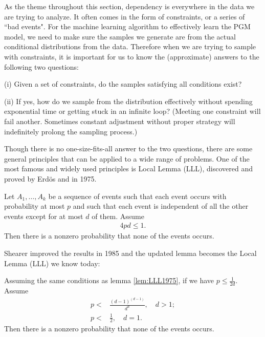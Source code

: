 As the theme throughout this section, dependency is everywhere in the data we
are trying to analyze. It often comes in the form of constraints, or a series
of ``bad events". For the machine learning algorithm to effectively learn the
PGM model, we need to make sure the samples we generate are from the actual
conditional distributions from the data. Therefore when we are trying to
sample with constraints, it is important for us to know the (approximate)
answers to the following two questions:

(i) Given a set of constraints, do the samples satisfying all conditions exist?

(ii) If yes, how do we sample from the distribution effectively without spending exponential time or getting stuck in an infinite loop? (Meeting one constraint will fail another. Sometimes constant adjustment without proper strategy will indefinitely prolong the sampling process.)

Though there is no one-size-fits-all answer to the two questions, there are
some general principles that can be applied to a wide range of problems. One of
the most famous and widely used principles is \lovasz Local Lemma (LLL),
discovered and proved by Erd\"os and \lovasz in 1975.

\begin{lemma} \label{lem:LLL1975}
    Let $A_1,\dots,A_k$ be a sequence of events such that each event occurs with probability at most $p$ and such that each event is independent of all the other events except for at most $d$ of them. Assume
    \begin{align}
        4pd \leq 1.
    \end{align}
    Then there is a nonzero probability that none of the events occurs.
\end{lemma}

Shearer improved the results in 1985 and the updated lemma becomes the \lovasz
Local Lemma (LLL) we know today:
\begin{lemma} \label{lem:LLL1985}
    Assuming the same conditions as lemma \ref{lem:LLL1975}, if we have $p \leq \frac{1}{2d}$. Assume
    \begin{align}
        p < & \frac{(d-1)^{(d-1)}}{d^d}, \quad d>1; \nonumber \\
        p < & \frac{1}{2}, \quad d=1.
    \end{align}
    Then there is a nonzero probability that none of the events occurs.
\end{lemma}

